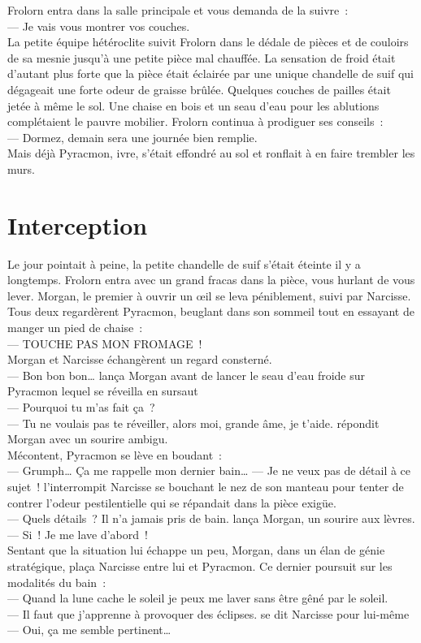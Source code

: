 \documentclass[french, a4paper, 12pt]{article}
\begin{document}
Frolorn entra dans la salle principale et vous demanda de la suivre~:\\
--- Je vais vous montrer vos couches.\\
La petite équipe hétéroclite suivit Frolorn dans le dédale de pièces et de couloirs de sa mesnie jusqu'à une petite pièce mal chauffée. La sensation de froid était d'autant plus forte que la pièce était éclairée par une unique chandelle de suif qui dégageait une forte odeur de graisse brûlée. Quelques couches de pailles était jetée à même le sol. Une chaise en bois et un seau d'eau pour les ablutions complétaient le pauvre mobilier. Frolorn continua à prodiguer ses conseils~:\\
--- Dormez, demain sera une journée bien remplie.\\
Mais déjà Pyracmon, ivre, s'était effondré au sol et ronflait à en faire trembler les murs.\\

\section{Interception}
Le jour pointait à peine, la petite chandelle de suif s'était éteinte il y a longtemps. Frolorn entra avec un grand fracas dans la pièce, vous hurlant de vous lever. Morgan, le premier à ouvrir un œil se leva péniblement, suivi par Narcisse. Tous deux regardèrent Pyracmon, beuglant dans son sommeil tout en essayant de manger un pied de chaise~:\\
--- TOUCHE PAS MON FROMAGE~!\\
Morgan et Narcisse échangèrent un regard consterné.\\
--- Bon bon bon… lança Morgan avant de lancer le seau d'eau froide sur Pyracmon lequel se réveilla en sursaut\\
--- Pourquoi tu m'as fait ça~?\\
--- Tu ne voulais pas te réveiller, alors moi, grande âme, je t'aide. répondit Morgan avec un sourire ambigu.\\
Mécontent, Pyracmon se lève en boudant~:\\
--- Grumph… Ça me rappelle mon dernier bain…
--- Je ne veux pas de détail à ce sujet~! l'interrompit Narcisse se bouchant le nez de son manteau pour tenter de contrer l'odeur pestilentielle qui se répandait dans la pièce exigüe.\\
--- Quels détails~? Il n'a jamais pris de bain. lança Morgan, un sourire aux lèvres.\\
--- Si~! Je me lave d'abord~!\\
Sentant que la situation lui échappe un peu, Morgan, dans un élan de génie stratégique, plaça Narcisse entre lui et Pyracmon. Ce dernier poursuit sur les modalités du bain~:\\
--- Quand la lune cache le soleil je peux me laver sans être gêné par le soleil.\\
--- Il faut que j'apprenne à provoquer des éclipses. se dit Narcisse pour lui-même\\
--- Oui, ça me semble pertinent…\\
\end{document}
